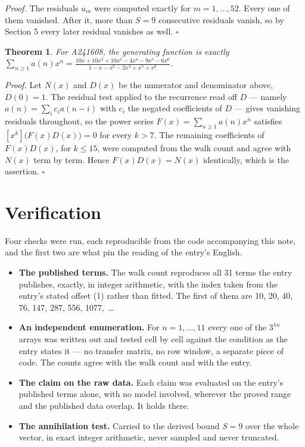 \documentclass[11pt]{article}
\newtheorem{theorem}{Theorem}
\theoremstyle{definition}
\begin{document}
{\itshape Proof.} The residuals $u_m$ were computed exactly for $m = 1,\dots,52$. Every one of them vanished. After it, more than $S = 9$ consecutive residuals vanish, so by Section 5 every later residual vanishes as well. $\square$

\begin{theorem} For A241608, the generating function is exactly $\sum_{n\ge 1} a(n)x^n = \frac{10x + 10x^{2} + 10x^{3} - 4x^{4} - 9x^{5} - 6x^{6}}{1 - x - x^{2} - 2x^{3} + x^{5} + x^{6}}$.\end{theorem}

{\itshape Proof.} Let $N(x)$ and $D(x)$ be the numerator and denominator above, $D(0)=1$. The residual test applied to the recurrence read off $D$ --- namely $a(n) = \sum_i c_i a(n-i)$ with $c_i$ the negated coefficients of $D$ --- gives vanishing residuals throughout, so the power series $F(x)=\sum_{n\ge 1}a(n)x^n$ satisfies $[x^k]\bigl(F(x)D(x)\bigr) = 0$ for every $k > 7$. The remaining coefficients of $F(x)D(x)$, for $k \le 15$, were computed from the walk count and agree with $N(x)$ term by term. Hence $F(x)D(x) = N(x)$ identically, which is the assertion. $\square$

\section{Verification}

Four checks were run, each reproducible from the code accompanying this note, and the first two are what pin the reading of the entry's English.

\begin{itemize}

\item {\bfseries The published terms.} The walk count reproduces all 31 terms the entry publishes, exactly, in integer arithmetic, with the index taken from the entry's stated offset (1) rather than fitted. The first of them are 10, 20, 40, 76, 147, 287, 556, 1077,~\dots

\item {\bfseries An independent enumeration.} For $n = 1,\dots,11$ every one of the $3^{1n}$ arrays was written out and tested cell by cell against the condition as the entry states it --- no transfer matrix, no row window, a separate piece of code. The counts agree with the walk count and with the entry.

\item {\bfseries The claim on the raw data.} Each claim was evaluated on the entry's published terms alone, with no model involved, wherever the proved range and the published data overlap. It holds there.

\item {\bfseries The annihilation test.} Carried to the derived bound $S = 9$ over the whole vector, in exact integer arithmetic, never sampled and never truncated.

\end{itemize}
\end{document}
